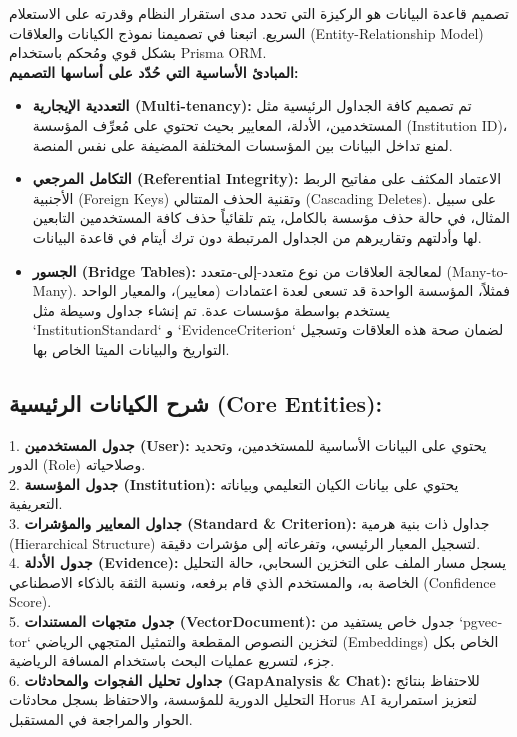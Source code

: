 \documentclass[12pt, a4paper]{report}
\begin{document}
\begin{english}
تصميم قاعدة البيانات هو الركيزة التي تحدد مدى استقرار النظام وقدرته على الاستعلام السريع. اتبعنا في تصميمنا نموذج الكيانات والعلاقات (Entity-Relationship Model) بشكل قوي ومُحكم باستخدام Prisma ORM. \\

\textbf{المبادئ الأساسية التي حُدّد على أساسها التصميم:} \\
\begin{itemize}
\item \textbf{التعددية الإيجارية (Multi-tenancy):} تم تصميم كافة الجداول الرئيسية مثل المستخدمين، الأدلة، المعايير بحيث تحتوي على مُعرِّف المؤسسة (Institution ID)، لمنع تداخل البيانات بين المؤسسات المختلفة المضيفة على نفس المنصة.
\item \textbf{التكامل المرجعي (Referential Integrity):} الاعتماد المكثف على مفاتيح الربط الأجنبية (Foreign Keys) وتقنية الحذف المتتالي (Cascading Deletes). على سبيل المثال، في حالة حذف مؤسسة بالكامل، يتم تلقائياً حذف كافة المستخدمين التابعين لها وأدلتهم وتقاريرهم من الجداول المرتبطة دون ترك أيتام في قاعدة البيانات.
\item \textbf{الجسور (Bridge Tables):} لمعالجة العلاقات من نوع متعدد-إلى-متعدد (Many-to-Many). فمثلاً، المؤسسة الواحدة قد تسعى لعدة اعتمادات (معايير)، والمعيار الواحد يستخدم بواسطة مؤسسات عدة. تم إنشاء جداول وسيطة مثل `InstitutionStandard` و `EvidenceCriterion` لضمان صحة هذه العلاقات وتسجيل التواريخ والبيانات الميتا الخاص بها.
\end{itemize}

\subsection*{شرح الكيانات الرئيسية (Core Entities):}
1. \textbf{جدول المستخدمين (User):} يحتوي على البيانات الأساسية للمستخدمين، وتحديد الدور (Role) وصلاحياته. \\
2. \textbf{جدول المؤسسة (Institution):} يحتوي على بيانات الكيان التعليمي وبياناته التعريفية. \\
3. \textbf{جداول المعايير والمؤشرات (Standard & Criterion):} جداول ذات بنية هرمية (Hierarchical Structure) لتسجيل المعيار الرئيسي، وتفرعاته إلى مؤشرات دقيقة. \\
4. \textbf{جدول الأدلة (Evidence):} يسجل مسار الملف على التخزين السحابي، حالة التحليل الخاصة به، والمستخدم الذي قام برفعه، ونسبة الثقة بالذكاء الاصطناعي (Confidence Score). \\
5. \textbf{جدول متجهات المستندات (VectorDocument):} جدول خاص يستفيد من `pgvector` لتخزين النصوص المقطعة والتمثيل المتجهي الرياضي (Embeddings) الخاص بكل جزء، لتسريع عمليات البحث باستخدام المسافة الرياضية. \\
6. \textbf{جداول تحليل الفجوات والمحادثات (GapAnalysis & Chat):} للاحتفاظ بنتائج التحليل الدورية للمؤسسة، والاحتفاظ بسجل محادثات Horus AI لتعزيز استمرارية الحوار والمراجعة في المستقبل. \\


\end{english}
\end{document}
